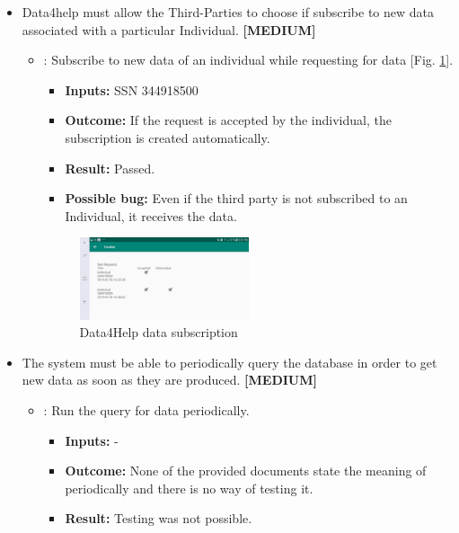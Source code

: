 \documentclass[a4paper, hidelinks, 12pt]{report}
\newcommand\requirement[1]{\item[{[REQ-#1]}] }
\newcommand\test[1]{\item[{[TEST-#1]}] }
\begin{document}
\begin{itemize}
	\requirement{12} Data4help must allow the Third-Parties to choose if subscribe to new data associated with a particular Individual. \textbf{[MEDIUM]}
			
				\begin{itemize}
		\test{11}: Subscribe to new data of an individual while requesting for data [Fig. \ref{fig:data_subscription}].
			\begin{itemize}
			\item \textbf{Inputs: } SSN 344918500			
			\item \textbf{Outcome: } If the request is accepted by the individual, the subscription is created automatically.
			\item \textbf{Result: } Passed.
			\item \textbf{Possible bug: } Even if the third party is not subscribed to an Individual, it receives the data.
			\end{itemize}
						
		\begin{figure}[H]
					\centering
				\includegraphics[width=0.5\textwidth]{images/data_subscription.jpeg}
					\caption[Data4Help data subscription]{Data4Help data subscription}
				\label{fig:data_subscription}
			\end{figure}		
		
	\end{itemize}
	
	\requirement{13} The system must be able to periodically query the database in order to get new data as soon as they are produced. \textbf{[MEDIUM]}	
			
				\begin{itemize}
		\test{12}: Run the query for data periodically.
			\begin{itemize}
			\item \textbf{Inputs: } -			
			\item \textbf{Outcome: } None of the provided documents state the meaning of periodically and there is no way of testing it.

			\item \textbf{Result: } Testing was not possible. 
			\end{itemize}
			

\end{itemize}
\end{itemize}
\end{document}
